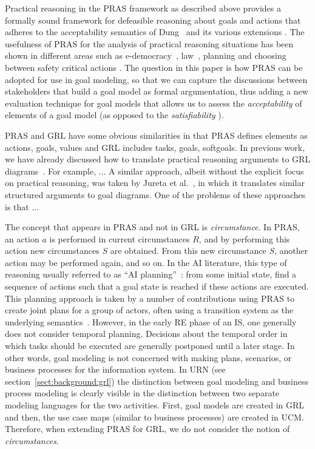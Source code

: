 \documentclass[11.5pt,two column]{llncs}
\begin{document}
Practical reasoning in the PRAS framework as described above provides a formally sound framework for defeasible reasoning about goals and actions that adheres to the acceptability semantics of Dung~\cite{Dung95} and its various extensions \cite{Amgoud, Modgil2009}. The usefulness of PRAS for the analysis of practical reasoning situations has been shown in different areas such as e-democracy~\cite{Atkinson2006}, law~\cite{???}, planning \cite{MedellinXXX} and choosing between safety critical actions \cite{}. The question in this paper is how PRAS can be adopted for use in goal modeling, so that we can capture the discussions between stakeholders that build a goal model as formal argumentation, thus adding a new evaluation technique for goal models that allows us to assess the \emph{acceptability} of elements of a goal model (as opposed to the \emph{satisfiability} \cite{}). 

PRAS  and GRL have some obvious similarities in that PRAS defines elements as actions, goals, values and GRL includes tasks, goals, softgoals. In previous work, we have already discussed how to translate practical reasoning arguments to GRL diagrams~\cite{}. For example, ... A similar approach, albeit without the explicit focus on practical reasoning, was taken by Jureta et al.~\cite{}, in which it translates similar structured arguments to goal diagrams. One of the problems of these approaches is that ...

The concept that appears in PRAS and not in GRL is \emph{circumstance}. In PRAS, an action $a$ is performed in current circumstances $R$, and by performing this action new circumstances $S$ are obtained. From this new circumstance $S$, another action may be performed again, and so on. In the AI literature, this type of reasoning usually referred to as ``AI planning''~\cite{weld1999recent}: from some initial state, find a sequence of actions such that a goal state is reached if these actions are executed. This planning approach is taken by a number of contributions using PRAS to create joint plans for a group of actors, often using a transition system as the underlying semantics~\cite{medellin2014}. However, in the early RE phase of an IS, one generally does not consider temporal planning. Decisions about the temporal order in which tasks should be executed are generally postponed until a later stage. In other words, goal modeling is not concerned with making plans, scenarios, or business processes for the information system. In URN (see section~\ref{sect:background:grl}) the distinction between goal modeling and business process modeling is clearly visible in the distinction between two separate modeling languages for the two activities. First, goal models are created in GRL and then, the use case maps (similar to business processes) are created in UCM. Therefore, when extending PRAS for GRL, we do not consider the notion of \emph{circumstances}.
\end{document}
